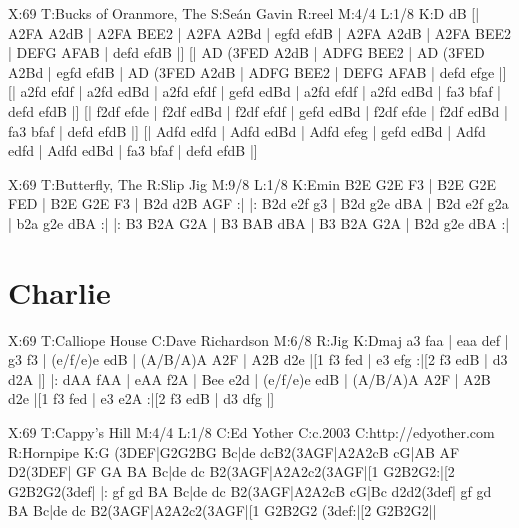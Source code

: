 \documentclass{article}
\begin{document}
\begin{abc}[name]
X:69
T:Bucks of Oranmore, The
S:Seán Gavin
R:reel
M:4/4
L:1/8
K:D
dB [| A2FA A2dB | A2FA BEE2 | A2FA A2Bd | egfd efdB |
A2FA A2dB | A2FA BEE2 | DEFG AFAB | defd efdB |]
[| AD (3FED A2dB | ADFG  BEE2 | AD (3FED A2Bd | egfd efdB |
AD (3FED A2dB | ADFG  BEE2 | DEFG AFAB | defd efge |]
[| a2fd efdf | a2fd edBd | a2fd efdf | gefd edBd |
a2fd efdf | a2fd edBd | fa3 bfaf | defd efdB |]
[| f2df efde | f2df edBd | f2df efdf | gefd edBd |
f2df efde | f2df edBd | fa3 bfaf | defd efdB |]
[| Adfd edfd | Adfd edBd | Adfd efeg | gefd edBd |
Adfd edfd | Adfd edBd | fa3 bfaf | defd efdB |]
\end{abc}

\begin{abc}[name]
X:69
T:Butterfly, The
R:Slip Jig
M:9/8
L:1/8
K:Emin
B2E G2E F3 | B2E G2E FED | B2E G2E F3 | B2d d2B AGF :|
|: B2d e2f g3 | B2d g2e dBA | B2d e2f g2a | b2a g2e dBA :|
|: B3 B2A G2A | B3 BAB dBA | B3 B2A G2A | B2d g2e dBA :|
\end{abc}

\section{Charlie}

\begin{abc}[name]
X:69
T:Calliope House
C:Dave Richardson
M:6/8
R:Jig
K:Dmaj
a3 faa | eaa def | g3 f3 | (e/f/e)e edB |
(A/B/A)A A2F | A2B d2e |[1 f3 fed | e3 efg :|[2 f3 edB | d3 d2A |]
|: dAA fAA | eAA f2A | Bee e2d | (e/f/e)e edB | (A/B/A)A A2F |
A2B d2e |[1 f3 fed | e3 e2A :|[2 f3 edB | d3 dfg |]
\end{abc}

\begin{abc}[name]
X:69
T:Cappy's Hill
M:4/4
L:1/8
C:Ed Yother
C:c.2003
C:http://edyother.com
R:Hornpipe
K:G
(3DEF|G2G2BG Bc|de dcB2(3AGF|A2A2cB cG|AB AF D2(3DEF|
GF GA BA Bc|de dc B2(3AGF|A2A2c2(3AGF|[1 G2B2G2:|[2 G2B2G2(3def|
|: gf gd BA Bc|de dc B2(3AGF|A2A2cB cG|Bc d2d2(3def|
gf gd BA Bc|de dc B2(3AGF|A2A2c2(3AGF|[1 G2B2G2 (3def:|[2 G2B2G2||
\end{abc}
\end{document}

